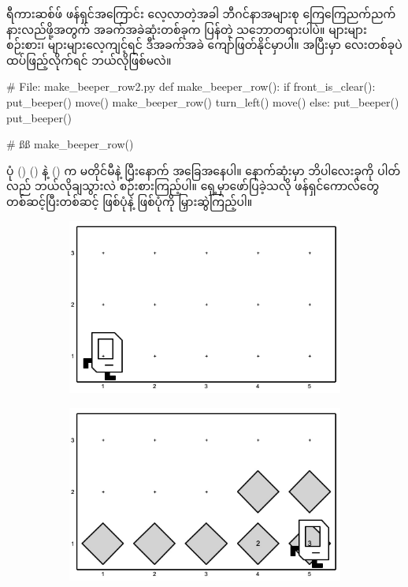 ရီကားဆစ်ဖ် ဖန်ရှင်အကြောင်း လေ့လာတဲ့အခါ ဘီဂင်နာအများစု ကြေကြေညက်ညက် နားလည်ဖို့အတွက် အခက်အခဲဆုံးတစ်ခုက  ပြန်တဲ့ သဘောတရားပါပဲ။  များများစဉ်းစား၊ များများလေ့ကျင့်ရင် ဒီအခက်အခဲ ကျော်ဖြတ်နိုင်မှာပါ။  အပြီးမှာ  လေးတစ်ခုပဲ ထပ်ဖြည့်လိုက်ရင် ဘယ်လိုဖြစ်မလဲ။
%
\begin{py}
# File: make_beeper_row2.py
def make_beeper_row():
    if front_is_clear():
        put_beeper()
        move()
        make_beeper_row()
        turn_left()
        move()
    else:
        put_beeper()
    put_beeper()

# ßß
make_beeper_row()
\end{py}
ပုံ (\fRefNo{\ref{fig:mrofb2}}) () နဲ့ () က မတိုင်မီနဲ့ ပြီးနောက် အခြေအနေပါ။ နောက်ဆုံးမှာ ဘိပါလေးခုကို ပါတ်လည် ဘယ်လိုချသွားလဲ စဉ်းစားကြည့်ပါ။ ရှေ့မှာဖော်ပြခဲ့သလို ဖန်ရှင်ကောလ်တွေ တစ်ဆင့်ပြီးတစ်ဆင့် ဖြစ်ပုံနဲ့  ဖြစ်ပုံကို မြှားဆွဲကြည့်ပါ။
\begin{figure}[thb!]
    \newcommand{\figpctw}{0.49}
    \begin{subfigure}[t]{{\figpctw}\textwidth}
        \includegraphics[scale=0.19]{images/ch04/mrofb2/1.jpg}
        \caption{}  
        \label{fig:mrofb2_1}   
    \end{subfigure}
    \begin{subfigure}[t]{{\figpctw}\textwidth}
        \includegraphics[scale=0.19]{images/ch04/mrofb2/2.jpg}
        \caption{}  
        \label{fig:mrofb2_2}  
    \end{subfigure}
    \caption{}
    \label{fig:mrofb2}
\end{figure}

